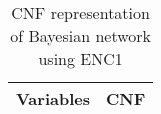 \begin{table}[]
\centering
\caption{CNF representation of Bayesian network using ENC1}
\label{cnfRepresentationEnc1}
\begin{tabular}{c|cl}
\hline
Variables & \multicolumn{2}{c}{CNF}                                                                                                                                                                                                                                                                                                                                                                                                                                                                                                                                                                                                                                                                                                                                                                                                                                                                                                                                                                                                                                                                                                                                                                                                                                                                                                                                                                                                                                                                                                                                        \\ \hline

\end{tabular}
\end{table}
